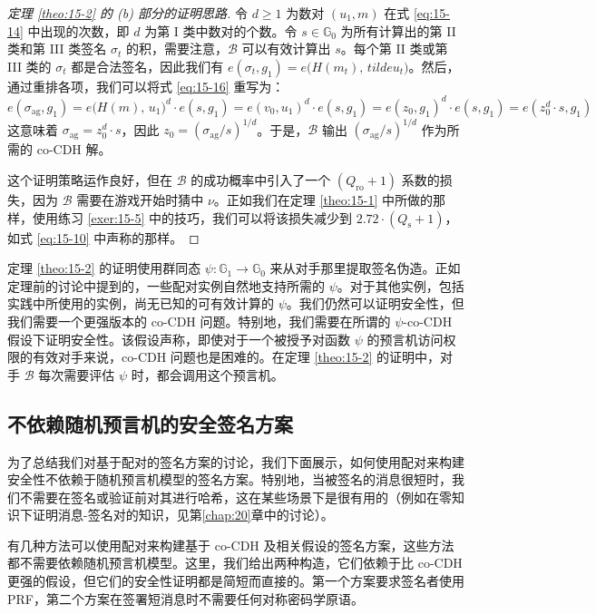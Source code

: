\begin{proof}[定理 \ref{theo:15-2} 的 (b) 部分的证明思路]
令 $d\geq 1$ 为数对 $(u_1,m)$ 在式 \ref{eq:15-14} 中出现的次数，即 $d$ 为第 I 类中数对的个数。令 $s\in\mathbb{G}_0$ 为所有计算出的第 II 类和第 III 类签名 $\sigma_t$ 的积，需要注意，$\mathcal{B}$ 可以有效计算出 $s$。每个第 II 类或第 III 类的 $\sigma_t$ 都是合法签名，因此我们有 $e(\sigma_t,g_1)=e\big(H(m_t),\,tilde{u}_t\big)$。然后，通过重排各项，我们可以将式 \ref{eq:15-16} 重写为：
\[
e(\sigma_\mathrm{ag},g_1)
=e\big(H(m),\,u_1\big)^d\cdot e(s,g_1)
=e(v_0,u_1)^d\cdot e(s,g_1)
=e(z_0,g_1)^d\cdot e(s,g_1)
=e(z_0^d\cdot s,g_1)
\]
这意味着 $\sigma_\mathrm{ag}=z_0^d\cdot s$，因此 $z_0=(\sigma_\mathrm{ag}/s)^{1/d}$。于是，$\mathcal{B}$ 输出 $(\sigma_\mathrm{ag}/s)^{1/d}$ 作为所需的 co-CDH 解。

这个证明策略运作良好，但在 $\mathcal{B}$ 的成功概率中引入了一个 $(Q_\mathrm{ro}+1)$ 系数的损失，因为 $\mathcal{B}$ 需要在游戏开始时猜中 $\nu$。正如我们在定理 \ref{theo:15-1} 中所做的那样，使用练习 \ref{exer:15-5} 中的技巧，我们可以将该损失减少到 $2.72\cdot(Q_\mathrm{s}+1)$，如式 \ref{eq:15-10} 中声称的那样。
\end{proof}

\begin{remark}\label{remark:15-7}
定理 \ref{theo:15-2} 的证明使用群同态 $\psi:\mathbb{G}_1\to\mathbb{G}_0$ 来从对手那里提取签名伪造。正如定理前的讨论中提到的，一些配对实例自然地支持所需的 $\psi$。对于其他实例，包括实践中所使用的实例，尚无已知的可有效计算的 $\psi$。我们仍然可以证明安全性，但我们需要一个更强版本的 co-CDH 问题。特别地，我们需要在所谓的 $\psi$-co-CDH 假设下证明安全性。该假设声称，即使对于一个被授予对函数 $\psi$ 的预言机访问权限的有效对手来说，co-CDH 问题也是困难的。在定理 \ref{theo:15-2} 的证明中，对手 $\mathcal{B}$ 每次需要评估 $\psi$ 时，都会调用这个预言机。
\end{remark}

\subsection{不依赖随机预言机的安全签名方案}\label{subsec:15-5-4}

为了总结我们对基于配对的签名方案的讨论，我们下面展示，如何使用配对来构建安全性不依赖于随机预言机模型的签名方案。特别地，当被签名的消息很短时，我们不需要在签名或验证前对其进行哈希，这在某些场景下是很有用的（例如在零知识下证明消息-签名对的知识，见第\ref{chap:20}章中的讨论）。

有几种方法可以使用配对来构建基于 co-CDH 及相关假设的签名方案，这些方法都不需要依赖随机预言机模型。这里，我们给出两种构造，它们依赖于比 co-CDH 更强的假设，但它们的安全性证明都是简短而直接的。第一个方案要求签名者使用 PRF，第二个方案在签署短消息时不需要任何对称密码学原语。

